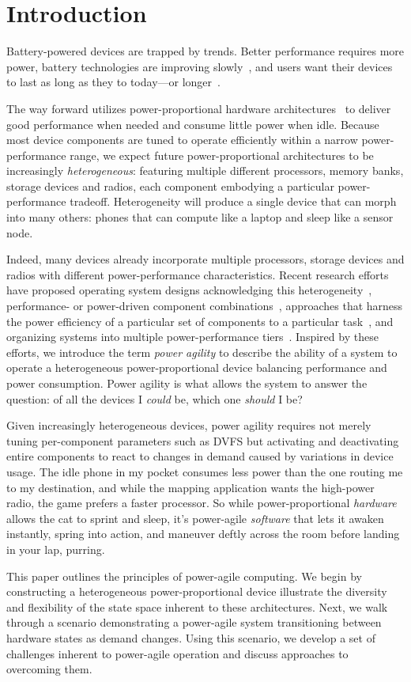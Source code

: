 \section{Introduction}

Battery-powered devices are trapped by trends. Better performance requires more
power, battery technologies are improving
slowly~\cite{economist-batteryhistory}, and users want their devices to last as
long as they to today---or longer~\cite{informationweek-batteries}.

The way forward utilizes power-proportional hardware
architectures~\cite{barroso-energyproportional} to deliver good performance
when needed and consume little power when idle. Because most device
components are tuned to operate efficiently within a narrow power-performance
range, we expect future power-proportional architectures to be increasingly
\textit{heterogeneous}: featuring multiple different processors, memory
banks, storage devices and radios, each component embodying a particular
power-performance tradeoff. Heterogeneity will produce a single device that
can morph into many others: phones that can compute like a laptop and sleep
like a sensor node.

Indeed, many devices already incorporate multiple processors, storage devices
and radios with different power-performance characteristics. Recent research
efforts have proposed operating system designs acknowledging this
heterogeneity~\cite{baumann-barrelfish}, performance- or power-driven component
combinations~\cite{mogul-hybridnvmdram,aruna-3Gwifi}, approaches that harness
the power efficiency of a particular set of components to a particular
task~\cite{andersen-fawn,szalay-amdahl}, and organizing systems into multiple
power-performance tiers~\cite{sorber-turducken}. Inspired by these efforts, we
introduce the term \textit{power agility} to describe the ability of a system
to operate a heterogeneous power-proportional device balancing performance and
power consumption. Power agility is what allows the system to answer the
question: of all the devices I \textit{could} be, which one \textit{should} I
be?

Given increasingly heterogeneous devices, power agility requires not merely
tuning per-component parameters such as DVFS but activating and deactivating
entire components to react to changes in demand caused by variations in device
usage. The idle phone in my pocket consumes less power than the one routing me
to my destination, and while the mapping application wants the high-power
radio, the game prefers a faster processor. So while power-proportional
\textit{hardware} allows the cat to sprint and sleep, it's power-agile
\textit{software} that lets it awaken instantly, spring into action, and
maneuver deftly across the room before landing in your lap, purring.

This paper outlines the principles of power-agile computing. We begin by
constructing a heterogeneous power-proportional device illustrate the diversity
and flexibility of the state space inherent to these architectures. Next, we
walk through a scenario demonstrating a power-agile system transitioning
between hardware states as demand changes. Using this scenario, we develop a
set of challenges inherent to power-agile operation and discuss approaches to
overcoming them.

